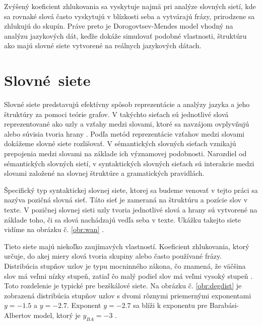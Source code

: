 Zvýšený koeficient zhlukovania sa vyskytuje najmä pri analýze slovných sietí, kde sa rovnaké slová často vyskytujú v blízkosti seba a vytvárajú frázy,
prirodzene sa zhlukujú do skupín. Práve preto je Dorogovtsev-Mendes model vhodný na analýzu jazykových dát, keďže dokáže simulovať podobné vlastnosti, štruktúru
ako majú slovné siete vytvorené na reálnych jazykových dátach. 

\section{Slovné~siete}\label{sec:word-networks}

Slovné siete predstavujú efektívny spôsob reprezentácie a analýzy jazyka a jeho štruktúry za pomoci teórie grafov.
V takýchto sieťach sú jednotlivé slová reprezentované ako uzly a vzťahy medzi slovami, ktoré sa navzájom ovplyvňujú alebo súvisia
tvoria hrany \cite{motter2002topology} . Podľa metód reprezentácie vzťahov medzi slovami dokážeme slovné siete rozlišovať.
V sémantických slovných sieťach vznikajú prepojenia medzi slovami na základe ich významovej podobnosti. Narozdiel od sémantických
slovných sietí, v syntaktických slovných sieťach sú interakcie medzi slovami založené na slovnej štruktúre a gramatických pravidlách.

Špecifický typ syntaktickej slovnej siete, ktorej sa budeme venovať v tejto práci sa nazýva pozičná slovná sieť. Táto sieť je zameraná na štruktúru
a pozície slov v texte. V pozičnej slovnej sieti uzly tvoria jednotlivé slová a hrany sú vytvorené na základe toho, či sa slová nachádzajú
vedľa seba v texte. Ukážku takejto siete vidíme na obrázku č. \ref{obr:wan} .

Tieto siete majú niekoľko zaujímavých vlastností. Koeficient zhlukovania, ktorý určuje, do akej
miery slová tvoria skupiny alebo často používané frázy. Distribúcia stupňov uzlov je
typu mocninného zákona, čo znamená, že väčšina slov má veľmi nízky stupeň, zatiaľ čo malý podiel slov má veľmi vysoký stupeň \cite{dorogovtsev2001language} .
Toto rozdelenie je typické pre bezškálové siete. Na obrázku č. \ref{obr:degdist} je zobrazená distribúcia stupňov uzlov s dvomi
rôznymi priemernými exponentami $y = -1.5$ a $y = -2.7$. Exponent $y = -2.7$ sa blíži k exponentu pre Barabási-Albertov model, ktorý je
$y_{BA} = -3$ \cite{cancho2001small} .

